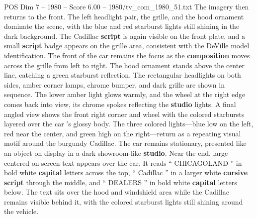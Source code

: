 \begin{textsample}{POS Dim 7 – 1980 – Score 6.00 – 1980/tv\_com\_1980\_51.txt}
The imagery then returns to the front.
The left headlight pair, the grille, and the hood ornament dominate the scene, with the blue and red starburst lights still shining in the dark background.
The Cadillac \textbf{script} is again visible on the front plate, and a small \textbf{script} badge appears on the grille area, consistent with the DeVille model identification.
The front of the car remains the focus as the \textbf{composition} moves across the grille from left to right.
The hood ornament stands above the center line, catching a green starburst reflection.
The rectangular headlights on both sides, amber corner lamps, chrome bumper, and dark grille are shown in sequence.
The lower amber light glows warmly, and the wheel at the right edge comes back into view, its chrome spokes reflecting the \textbf{studio} lights.
A final angled view shows the front right corner and wheel with the colored starbursts layered over the car ’s glossy body.
The three colored lights—blue low on the left, red near the center, and green high on the right—return as a repeating visual motif around the burgundy Cadillac.
The car remains stationary, presented like an object on display in a dark showroom-like \textbf{studio}.
Near the end, large centered on-screen text appears over the car.
It reads “ CHICAGOLAND ” in bold white \textbf{capital} letters across the top, “ Cadillac ” in a larger white \textbf{cursive} \textbf{script} through the middle, and “ DEALERS ” in bold white \textbf{capital} letters below.
The text sits over the hood and windshield area while the Cadillac remains visible behind it, with the colored starburst lights still shining around the vehicle.

\end{textsample}
